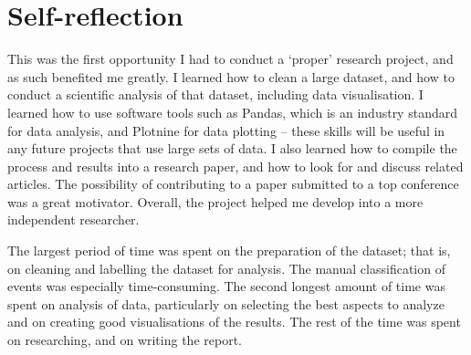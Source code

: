 \section{Self-reflection}
This was the first opportunity I had to conduct a `proper' research project, and as such benefited me greatly.
I learned how to clean a large dataset, and how to conduct a scientific analysis of that dataset, including data visualisation.
I learned how to use software tools such as Pandas, which is an industry standard for data analysis, and Plotnine for data plotting -- these skills will be useful in any future projects that use large sets of data.
I also learned how to compile the process and results into a research paper, and how to look for and discuss related articles.
The possibility of contributing to a paper submitted to a top conference was a great motivator.
Overall, the project helped me develop into a more independent researcher.

The largest period of time was spent on the preparation of the dataset; that is, on cleaning and labelling the dataset for analysis.
The manual classification of events was especially time-consuming.
The second longest amount of time was spent on analysis of data, particularly on selecting the best aspects to analyze and on creating good visualisations of the results.
The rest of the time was spent on researching, and on writing the report.
